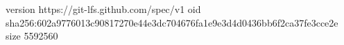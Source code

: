 version https://git-lfs.github.com/spec/v1
oid sha256:602a9776013c90817270e44e3dc704676fa1e9e3d4d0436bb6f2ca37fe3cce2e
size 5592560
